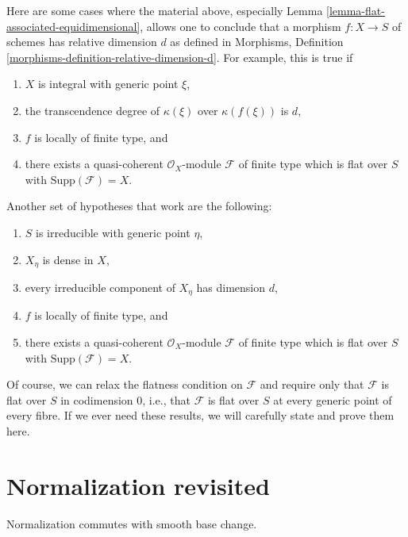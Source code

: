 \begin{remark}
\label{remark-flat-equidimensional}
Here are some cases where the material above, especially
Lemma \ref{lemma-flat-associated-equidimensional},
allows one to conclude that a morphism $f : X \to S$ of schemes
has relative dimension $d$ as defined in
Morphisms, Definition \ref{morphisms-definition-relative-dimension-d}.
For example, this is true if
\begin{enumerate}
\item $X$ is integral with generic point $\xi$,
\item the transcendence degree of $\kappa(\xi)$ over $\kappa(f(\xi))$ is $d$,
\item $f$ is locally of finite type, and
\item there exists a quasi-coherent $\mathcal{O}_X$-module $\mathcal{F}$
of finite type which is flat over $S$ with $\text{Supp}(\mathcal{F}) = X$.
\end{enumerate}
Another set of hypotheses that work are the following:
\begin{enumerate}
\item $S$ is irreducible with generic point $\eta$,
\item $X_\eta$ is dense in $X$,
\item every irreducible component of $X_\eta$ has dimension $d$,
\item $f$ is locally of finite type, and
\item there exists a quasi-coherent $\mathcal{O}_X$-module $\mathcal{F}$
of finite type which is flat over $S$ with $\text{Supp}(\mathcal{F}) = X$.
\end{enumerate}
Of course, we can relax the flatness condition on $\mathcal{F}$
and require only that $\mathcal{F}$ is flat over $S$ in codimension $0$,
i.e., that $\mathcal{F}$ is flat over $S$ at every generic point of
every fibre. If we ever need these results, we will carefully state and
prove them here.
\end{remark}











\section{Normalization revisited}
\label{section-normalization}

\noindent
Normalization commutes with smooth base change.

